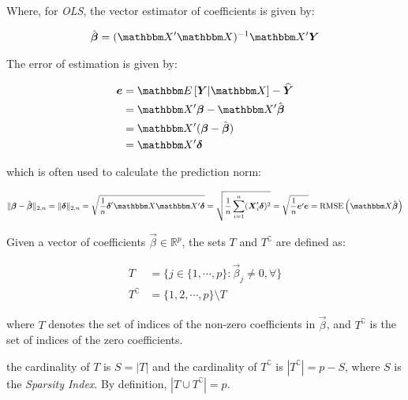 Where, for \emph{OLS}, the vector estimator of coefficients is given by:

\begin{align*}
\hat{\Vec{\beta}} = (\Mat{X}'\Mat{X})^{-1}\Mat{X}'\Vec{Y}
\end{align*}

The error of estimation is given by:

\begin{align*}
\Vec{e} &= \E{\Vec{Y}|\Mat{X}} - \widehat{\Vec{Y}}\\
&= \Mat{X}'\Vec{\beta} - \Mat{X}'\hat{\Vec{\beta}}\\
&= \Mat{X}'(\Vec{\beta} - \hat{\Vec{\beta}}) \\
&= \Mat{X}'\Vec{\delta}
\end{align*}

which is often used to calculate the prediction norm:

\begin{align*}
\|\Vec{\beta} - \hat{\Vec{\beta}}\|_{2,n} 
    = \|\Vec{\delta}\|_{2,n} 
    = \sqrt{\frac{1}{n} \Vec{\delta}'\Mat{X}\Mat{X}'\Vec{\delta}} 
    = \sqrt{\frac{1}{n} \sum_{i=1}^{n} (\Vec{X}_i'\Vec{\delta})^2}
    = \sqrt{\frac{1}{n} \Vec{e}'\Vec{e}}
    = \rmse{\Mat{X}\hat{\Vec{\beta}}}
\end{align*}

\begin{Def}
Given a vector of  coefficients $\Vec{\beta} \in \mathbb{R}^p$, the sets $T$ and $T^{\complement}$ are defined as:

\begin{align*}
T &= \lbrace
j \in \{1, \cdots, p \} : \Vec{\beta}_j \neq 0, \forall 
\rbrace  \\
T^{\complement} &= \{1, 2, \cdots, p\} \setminus T
\end{align*}

where $T$ denotes the set of indices of the non-zero coefficients in $\Vec{\beta}$, and $T^{\complement}$ is the set of indices of the zero coefficients.

the cardinality of $T$ is $S = |T|$ and the cardinality of $T^{\complement}$ is $|T^{\complement}| = p - S$, where $S$ is the \emph{Sparsity Index}. By definition, $|T \cup T^{\complement}| = p$.
\end{Def}

